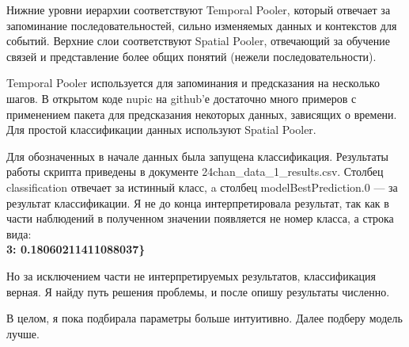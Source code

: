 \documentclass[12 pt, Times New Roman, a4paper]{article}
\begin{document}
\begin{figure}[h]
\begin{minipage}[h]{0.49\linewidth}
\end{minipage}
\hfill
\begin{minipage}[h]{0.49\linewidth}
\end{minipage}
\caption{}
\label{fig:htm1}
\end{figure}

Нижние уровни иерархии соответствуют Temporal Pooler, который отвечает за запоминание последовательностей, сильно изменяемых данных и контекстов для событий. Верхние слои соответствуют Spatial Pooler, отвечающий за обучение связей и представление более общих понятий (нежели последовательности).

Temporal Pooler используется для запоминания и предсказания на несколько шагов. В открытом коде nupic на github'е достаточно много примеров с применением пакета для предсказания некоторых данных, зависящих о времени. Для простой классификации данных используют Spatial Pooler. 

Для обозначенных в начале данных была запущена классификация. Результаты работы скрипта приведены в документе 24chan\_data\_1\_results.csv. Столбец classification отвечает за истинный класс, a столбец modelBestPrediction.0 --- за результат классификации. Я не до конца интерпретировала результат, так как в части наблюдений в полученном значении появляется не номер класса, а строка вида:\\
 \textbf{3: 0.18060211411088037\}  }
 
Но за исключением части не интерпретируемых результатов, классификация верная. Я найду путь решения проблемы, и после опишу результаты численно.

В целом, я пока подбирала параметры больше интуитивно. Далее подберу модель лучше. 
\end{document}
